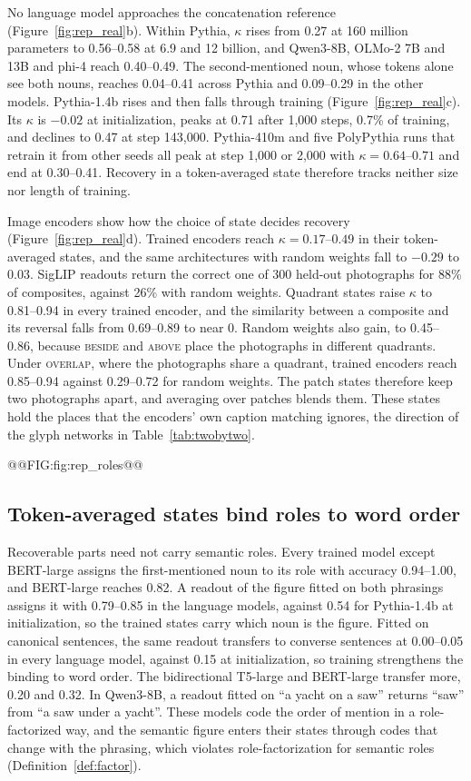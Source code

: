 \label{sec:llm}No language model approaches the concatenation reference (Figure~\ref{fig:rep_real}b). Within Pythia, $\kappa$ rises from 0.27 at 160 million parameters to 0.56--0.58 at 6.9 and 12 billion, and Qwen3-8B, OLMo-2 7B and 13B and phi-4 reach 0.40--0.49. The second-mentioned noun, whose tokens alone see both nouns, reaches 0.04--0.41 across Pythia and 0.09--0.29 in the other models. Pythia-1.4b rises and then falls through training (Figure~\ref{fig:rep_real}c). Its $\kappa$ is $-0.02$ at initialization, peaks at 0.71 after 1{,}000 steps, 0.7\% of training, and declines to 0.47 at step 143{,}000. Pythia-410m and five PolyPythia runs that retrain it from other seeds all peak at step 1{,}000 or 2{,}000 with $\kappa = 0.64$--$0.71$ and end at 0.30--0.41. Recovery in a token-averaged state therefore tracks neither size nor length of training.

\label{sec:vision}Image encoders show how the choice of state decides recovery (Figure~\ref{fig:rep_real}d). Trained encoders reach $\kappa = 0.17$--$0.49$ in their token-averaged states, and the same architectures with random weights fall to $-0.29$ to $0.03$. SigLIP readouts return the correct one of 300 held-out photographs for 88\% of composites, against 26\% with random weights. Quadrant states raise $\kappa$ to 0.81--0.94 in every trained encoder, and the similarity between a composite and its reversal falls from 0.69--0.89 to near 0. Random weights also gain, to 0.45--0.86, because \textsc{beside} and \textsc{above} place the photographs in different quadrants. Under \textsc{overlap}, where the photographs share a quadrant, trained encoders reach 0.85--0.94 against 0.29--0.72 for random weights. The patch states therefore keep two photographs apart, and averaging over patches blends them. These states hold the places that the encoders' own caption matching ignores, the direction of the glyph networks in Table~\ref{tab:twobytwo}.

@@FIG:fig:rep_roles@@

\subsection{Token-averaged states bind roles to word order}
\label{sec:roles}

Recoverable parts need not carry semantic roles. Every trained model except BERT-large assigns the first-mentioned noun to its role with accuracy 0.94--1.00, and BERT-large reaches 0.82. A readout of the figure fitted on both phrasings assigns it with 0.79--0.85 in the language models, against 0.54 for Pythia-1.4b at initialization, so the trained states carry which noun is the figure. Fitted on canonical sentences, the same readout transfers to converse sentences at 0.00--0.05 in every language model, against 0.15 at initialization, so training strengthens the binding to word order. The bidirectional T5-large and BERT-large transfer more, 0.20 and 0.32. In Qwen3-8B, a readout fitted on ``a yacht on a saw'' returns ``saw'' from ``a saw under a yacht''. These models code the order of mention in a role-factorized way, and the semantic figure enters their states through codes that change with the phrasing, which violates role-factorization for semantic roles (Definition~\ref{def:factor}).

